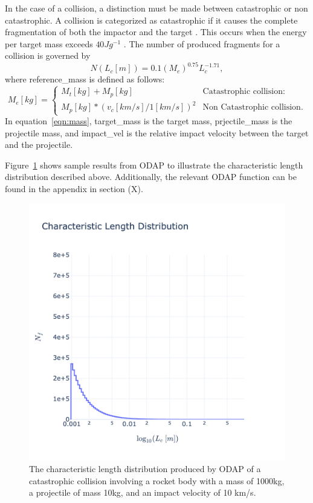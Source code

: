 \documentclass[a4paper, 12pt]{article}
\begin{document}
In the case of a collision, a distinction must be made between catastrophic or non catastrophic. A collision is categorized as catastrophic if it causes the complete fragmentation of both the impactor and the target \citep{letizia_space_2016}. This occurs when the energy per target mass exceeds $40 J g^{-1}$ \citep{krisko_proper_2011}. The number of produced fragments for a collision is governed by
\begin{equation}
	N(L_c [m]) = 0.1 (M_e)^{0.75} L_c^{-1.71},
\end{equation}
where \Gls{reference_mass} is defined as follows: 
\begin{equation}
	M_e[kg] = \begin{cases}
		M_t [kg] + M_p[kg]& \text{Catastrophic collision: } \\
		 M_p[kg] * (v_c [km/s] / 1 [km/s])^2 & \text{Non Catastrophic collision}.	
	\end{cases}
	\label{eqn:mass}
\end{equation}
\noindent In equation~\ref{eqn:mass},  \Gls{target_mass} is the target mass, \Gls{prjectile_mass} is the projectile mass, and \Gls{impact_vel} is the relative impact velocity between the target and the projectile.

Figure~\ref{fig:N_f_v_L_c} shows sample results from ODAP to illustrate the characteristic length distribution described above. Additionally, the relevant ODAP function can be found in the appendix in section (X).
\begin{figure}[H]
	\centering
	\includegraphics[scale=0.3, trim=0cm 0cm 0cm 10cm]{N_f_vs_L_c}
	\caption{The characteristic length distribution produced by ODAP of a catastrophic collision involving a rocket body with a mass of 1000kg, a projectile of mass 10kg, and an impact velocity of 10 km/s.}
	\label{fig:N_f_v_L_c}
\end{figure}
\end{document}
